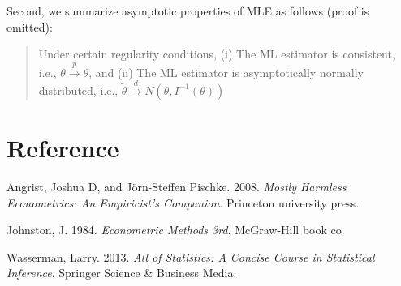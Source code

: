 \documentclass[
  12pt,
]{article}
\newlength{\cslhangindent}
\newenvironment{cslreferences}%
  {\setlength{\parindent}{0pt}%
  \everypar{\setlength{\hangindent}{\cslhangindent}}\ignorespaces}%
  {\par}
\begin{document}
Second, we summarize asymptotic properties of MLE as follows (proof is
omitted):

\begin{quote}
Under certain regularity conditions, (i) The ML estimator is consistent,
i.e., \(\tilde{\theta} \overset{p}{\to} \theta\), and (ii) The ML
estimator is asymptotically normally distributed, i.e.,
\(\tilde{\theta} \overset{d}{\to} N(\theta, I^{-1}(\theta))\)
\end{quote}

\hypertarget{reference}{%
\section*{Reference}\label{reference}}

\hypertarget{refs}{}
\begin{cslreferences}
\leavevmode\hypertarget{ref-angrist2008mostly}{}%
Angrist, Joshua D, and Jörn-Steffen Pischke. 2008. \emph{Mostly Harmless
Econometrics: An Empiricist's Companion}. Princeton university press.

\leavevmode\hypertarget{ref-johnston1984econometric}{}%
Johnston, J. 1984. \emph{Econometric Methods 3rd}. McGraw-Hill book co.

\leavevmode\hypertarget{ref-wasserman2013all}{}%
Wasserman, Larry. 2013. \emph{All of Statistics: A Concise Course in
Statistical Inference}. Springer Science \& Business Media.
\end{cslreferences}
\end{document}
